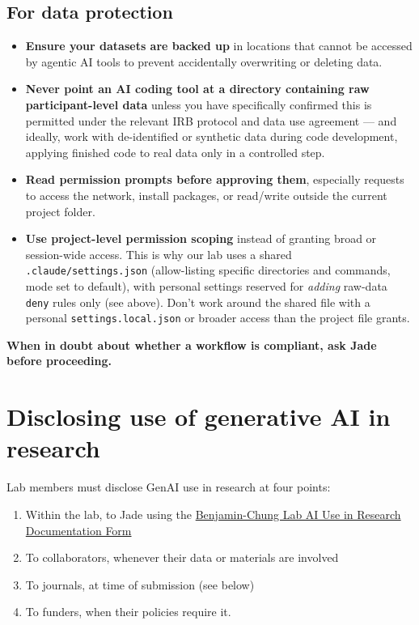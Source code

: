 \documentclass[
]{book}
\providecommand{\tightlist}{%
  \setlength{\itemsep}{0pt}\setlength{\parskip}{0pt}}
\begin{document}
\subsection{For data protection}\label{for-data-protection}

\begin{itemize}
\tightlist
\item
  \textbf{Ensure your datasets are backed up} in locations that cannot be
  accessed by agentic AI tools to prevent accidentally overwriting or
  deleting data.
\item
  \textbf{Never point an AI coding tool at a directory containing raw
  participant-level data} unless you have specifically confirmed this
  is permitted under the relevant IRB protocol and data use agreement ---
  and ideally, work with de-identified or synthetic data during code
  development, applying finished code to real data only in a controlled
  step.
\item
  \textbf{Read permission prompts before approving them}, especially requests
  to access the network, install packages, or read/write outside the
  current project folder.
\item
  \textbf{Use project-level permission scoping} instead of granting broad or session-wide access. This is why our lab uses a shared \texttt{.claude/settings.json} (allow-listing specific directories and commands, mode set to default), with personal settings reserved for \emph{adding} raw-data \texttt{deny} rules only (see above). Don't work around the shared file with a personal \texttt{settings.local.json} or broader access than the project file grants.
\end{itemize}

\textbf{When in doubt about whether a workflow is compliant, ask Jade before
proceeding.}

\section{Disclosing use of generative AI in research}\label{disclosing-use-of-generative-ai-in-research}

Lab members must disclose GenAI use in research at four points:

\begin{enumerate}
\def\labelenumi{\arabic{enumi}.}
\tightlist
\item
  Within the lab, to Jade using the \href{https://docs.google.com/forms/d/e/1FAIpQLScphiuDTkUXH0RVFFuj-I4KqgmxXP796MfV9mLeQ2uY8k9mgA/viewform?usp=publish-editor}{Benjamin-Chung Lab AI Use in
  Research Documentation
  Form}
\item
  To collaborators, whenever their data or materials are involved
\item
  To journals, at time of submission (see below)
\item
  To funders, when their policies require it.
\end{enumerate}
\end{document}
